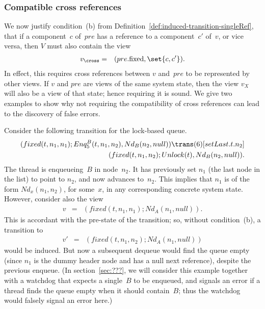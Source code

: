 

\subsubsection{Compatible cross references}
\label{ssec:cross-refs}

We now justify condition~(b) from
Definition~\ref{def:induced-transition-singleRef}, that if a component~$c$
of~$pre$ has a reference to a component~$c'$ of~$v$, or vice versa, then $V$
must also contain the view
\begin{eqnarray*}
v_\cross & = & (pre.\fixed, \set{c, c'}).
\end{eqnarray*} 
In effect, this requires cross references between $v$ and~$pre$ to be
represented by other views.  If $v$ and $pre$ are views of the same system
state, then the view $v_X$ will also be a view of that state; hence requiring
it is sound.
%
We give two examples to show why not requiring the compatibility of cross
references can lead to the discovery of false errors. 

Consider the following transition for the lock-based queue.
\[
\begin{align}
(fixed(t, n_1, n_1); Enq_5^B(t, n_1, n_2), Nd_B(n_2, null)) 
  \trans(6)[setLast.t.n_2] \\
\qquad (fixed(t, n_1, n_2); Unlock(t), Nd_B(n_2, null)).
\end{align}
\]
The thread is enqueueing~$B$ in node~$n_2$.  It has previously set $n_1$ (the
last node in the list) to point to $n_2$, and now advances 
to~$n_2$.  This implies that $n_1$ is of the form $Nd_x(n_1, n_2)$, for
some~$x$, in any corresponding concrete system state.  However, consider also
the view
%
\begin{eqnarray*}
v & = & (fixed(t, n_1, n_1) ; Nd_A(n_1, null)).
\end{eqnarray*}
This is accordant with the pre-state of the transition; so, without
condition~(b), a transition to
\begin{eqnarray*}
v' & = & (fixed(t, n_1, n_2) ; Nd_A(n_1, null))
\end{eqnarray*}
would be induced.  But now a subsequent dequeue would find the queue empty
(since $n_1$ is the dummy header node and has a null next reference), despite
the previous enqueue.  (In section~\ref{sec:???}, we will consider this
example together with a watchdog that expects a single~$B$ to be enqueued, and
signals an error if a thread finds the queue empty when it should contain~$B$;
thus the watchdog would falsely signal an error here.)

